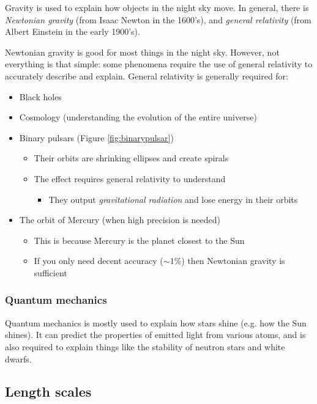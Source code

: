 \documentclass[12pt]{article}
\begin{document}
Gravity is used to explain how objects in the night sky move.
In general, there is \emph{Newtonian gravity} (from Isaac Newton in the 1600's), and \emph{general relativity} (from Albert Einstein in the early 1900's).

Newtonian gravity is good for most things in the night sky.
However, not everything is that simple: some phenomena require the use of general relativity to accurately describe and explain.
General relativity is generally required for:
	
\begin{itemize}
	\item Black holes
	\item Cosmology (understanding the evolution of the entire universe)
	\item Binary pulsars (Figure \ref{fig:binarypulsar})
	\begin{itemize}
		\item Their orbits are shrinking ellipses and create spirals
		\item The effect requires general relativity to understand
		\begin{itemize}
			\item They output \emph{gravitational radiation} and lose energy in their orbits
		\end{itemize}
	\end{itemize}
	\item The orbit of Mercury (when high precision is needed)
	\begin{itemize}
		\item This is because Mercury is the planet closest to the Sun
		\item If you only need decent accuracy ($\sim 1\%$) then Newtonian gravity is sufficient
	\end{itemize}
\end{itemize}


\subsubsection{Quantum mechanics}

Quantum mechanics is mostly used to explain how stars shine (e.g. how the Sun shines).
It can predict the properties of emitted light from various atoms, and is also required to explain things like the stability of neutron stars and white dwarfs.

\newpage

\subsection{Length scales}
\end{document}
